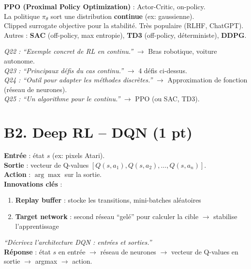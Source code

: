 \documentclass[11pt,a4paper]{article}
\begin{document}
\begin{formbox}
\textbf{PPO (Proximal Policy Optimization)} : Actor-Critic, on-policy.\\
La politique $\pi_\theta$ sort une distribution \textbf{continue} (ex: gaussienne).\\
Clipped surrogate objective pour la stabilité. Très populaire (RLHF, ChatGPT).\\[4pt]
Autres : \textbf{SAC} (off-policy, max entropie), \textbf{TD3} (off-policy, déterministe), \textbf{DDPG}.
\end{formbox}

\begin{exambox}
\textit{Q22 : ``Exemple concret de RL en continu.''} $\to$ Bras robotique, voiture autonome.\\
\textit{Q23 : ``Principaux défis du cas continu.''} $\to$ 4 défis ci-dessus.\\
\textit{Q24 : ``Outil pour adapter les méthodes discrètes.''} $\to$ Approximation de fonction (réseau de neurones).\\
\textit{Q25 : ``Un algorithme pour le continu.''} $\to$ PPO (ou SAC, TD3).
\end{exambox}

\section{B2. Deep RL -- DQN (1 pt)}

\begin{formbox}
\textbf{Entrée} : état $s$ (ex: pixels Atari).\\
\textbf{Sortie} : vecteur de Q-values $[Q(s,a_1), Q(s,a_2), \ldots, Q(s,a_n)]$.\\
\textbf{Action} : $\arg\max$ sur la sortie.\\[4pt]
\textbf{Innovations clés} :
\begin{enumerate}[nosep]
\item \textbf{Replay buffer} : stocke les transitions, mini-batches aléatoires
\item \textbf{Target network} : second réseau ``gelé'' pour calculer la cible $\to$ stabilise l'apprentissage
\end{enumerate}
\end{formbox}

\begin{exambox}
\textit{``Décrivez l'architecture DQN : entrées et sorties.''}\\[4pt]
\textbf{Réponse} : état $s$ en entrée $\to$ réseau de neurones $\to$ vecteur de Q-values en sortie $\to$ argmax $\to$ action.
\end{exambox}
\end{document}
